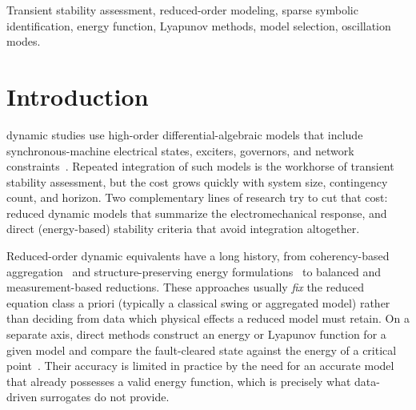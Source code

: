 \documentclass[journal]{IEEEtran}
\begin{document}
\begin{IEEEkeywords}
Transient stability assessment, reduced-order modeling, sparse symbolic
identification, energy function, Lyapunov methods, model selection, oscillation
modes.
\end{IEEEkeywords}

\section{Introduction}

 dynamic studies use high-order
differential-algebraic models that include synchronous-machine electrical
states, exciters, governors, and network constraints~\cite{kundur1994}.
Repeated integration of such models is the workhorse of transient stability
assessment, but the cost grows quickly with system size, contingency count, and
horizon. Two complementary lines of research try to cut that cost: reduced
dynamic models that summarize the electromechanical response, and direct
(energy-based) stability criteria that avoid integration altogether.

Reduced-order dynamic equivalents have a long history, from coherency-based
aggregation~\cite{chow2013coherency} and structure-preserving energy
formulations~\cite{bergen1981structure} to balanced and measurement-based
reductions. These approaches usually \emph{fix} the reduced equation class a
priori (typically a classical swing or aggregated model) rather than deciding
from data which physical effects a reduced model must retain. On a separate
axis, direct methods construct an energy or Lyapunov function for a given model
and compare the fault-cleared state against the energy of a critical
point~\cite{pai1989energy,chiang2011direct}. Their accuracy is limited in
practice by the need for an accurate model that already possesses a valid
energy function, which is precisely what data-driven surrogates do not provide.
\end{document}
